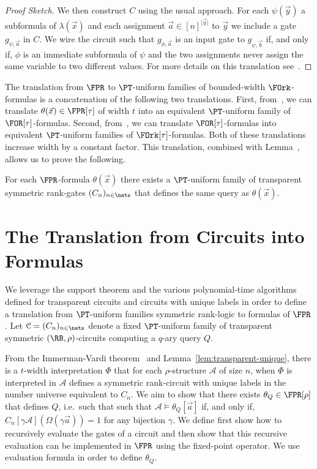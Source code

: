 \documentclass[a4paper,UKenglish]{lipics-v2018}
\begin{document}
\begin{proof}[Proof Sketch]
  We then construct $C$ using the usual approach. For each $\psi(\vec{y})$ a
  subformula of $\lambda(\vec{x})$ and each assignment $\vec{a} \in [n]^{\vert
    \vec{y} \vert}$ to $\vec{y}$ we include a gate $g_{\psi, \vec{a}}$ in $C$.
  We wire the circuit such that $g_{\phi, \vec{a}}$ is an input gate to
  $g_{\psi, \vec{b}}$ if, and only if, $\phi$ is an immediate subformula of
  $\psi$ and the two assignments never assign the same variable to two different
  values. For more details on this translation see~\cite{}.
\end{proof}

The translation from $\FPR$ to $\PT$-uniform families of bounded-width
$\FOrk$-formulas is a concatenation of the following two translations. First,
from~\cite{Dawar09logicswith}, we can translate $\theta(\vec{x}) \in \FPR[\tau]$
of width $t$ into an equivalent $\PT$-uniform family of $\FOR[\tau]$-formulas.
Second, from~\cite{libkin2004elements}, we can translate $\FOR[\tau]$-formulas
into equivalent $\PT$-uniform families of $\FOrk[\tau]$-formulas. Both of these
translations increase width by a constant factor. This translation, combined
with Lemma~\cite{lem:translating-FOrk}, allows us to prove the following.

\begin{theorem}
  For each $\FPR$-formula $\theta(\vec{x})$ there exists a $\PT$-uniform family
  of transparent symmetric rank-gates $(C_n)_{n \in \nats}$ that defines the
  same query as $\theta(\vec{x})$.
  \label{thm:translating-formulas-to-circuits}
\end{theorem}

\section{The Translation from Circuits into Formulas}
We leverage the support theorem and the various polynomial-time algorithms
defined for transparent circuits and circuits with unique labels in order to
define a translation from $\PT$-uniform families symmetric rank-logic to
formulas of $\FPR$. Let $\mathcal{C} = (C_n)_{n \in \nats}$ denote a fixed
$\PT$-uniform family of transparent symmetric $(\RB, \rho)$-circuits computing a
$q$-ary query $Q$.

From the Immerman-Vardi theorem~\cite{Immerman198686, Vardi:1982} and
Lemma~\ref{lem:transparent-unique}, there is a $t$-width interpretation $\Phi$
that for each $\rho$-structure $\mathcal{A}$ of size $n$, when $\Phi$ is
interpreted in $\mathcal{A}$ defines a symmetric rank-circuit with unique labels
in the number universe equivalent to $C_n$. We aim to show that there exists
$\theta_Q \in \FPR[\rho]$ that defines $Q$, i.e.\ such that such that
$\mathcal{A} \models \theta_Q[\vec{a}]$ if, and only if, $C_n[\gamma
\mathcal{A}](\Omega (\gamma \vec{a})) = 1$ for any bijection $\gamma$. We define
first show how to recursively evaluate the gates of a circuit and then show that
this recursive evaluation can be implemented in $\FPR$ using the fixed-point
operator. We use evaluation formula in order to define $\theta_Q$.
\end{document}
